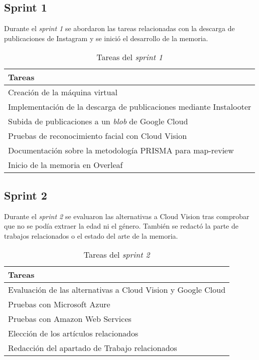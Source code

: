 \subsection{Sprint 1}
Durante el \textit{sprint 1} se abordaron las tareas relacionadas con la descarga de publicaciones de Instagram y se inició el desarrollo de la memoria.

\begin{table}[H]
    \centering
    \begin{tabular}{l}
    \hline
    \textbf{Tareas} \\ \hline
    Creación de la máquina virtual \\
    Implementación de la descarga de publicaciones mediante Instalooter \\
    Subida de publicaciones a un \textit{blob} de Google Cloud \\
    Pruebas de reconocimiento facial con Cloud Vision \\
    Documentación sobre la metodología PRISMA para map-review \\
    Inicio de la memoria en Overleaf \\ \hline
    \end{tabular}
    \caption{Tareas del \textit{sprint 1}}
    \label{tab:tasks_sprint1}
\end{table}

\subsection{Sprint 2}
Durante el \textit{sprint 2} se evaluaron las alternativas a Cloud Vision tras comprobar que no se podía extraer la edad ni el género. También se redactó la parte de trabajos relacionados o el estado del arte de la memoria.

\begin{table}[H]
    \centering
    \begin{tabular}{l}
    \hline
    \textbf{Tareas} \\ \hline
    Evaluación de las alternativas a Cloud Vision y Google Cloud \\
    Pruebas con Microsoft Azure \\
    Pruebas con Amazon Web Services \\
    Elección de los artículos relacionados \\
    Redacción del apartado de Trabajo relacionados \\ \hline
    \end{tabular}
    \caption{Tareas del \textit{sprint 2}}
    \label{tab:tasks_sprint2}
\end{table}

